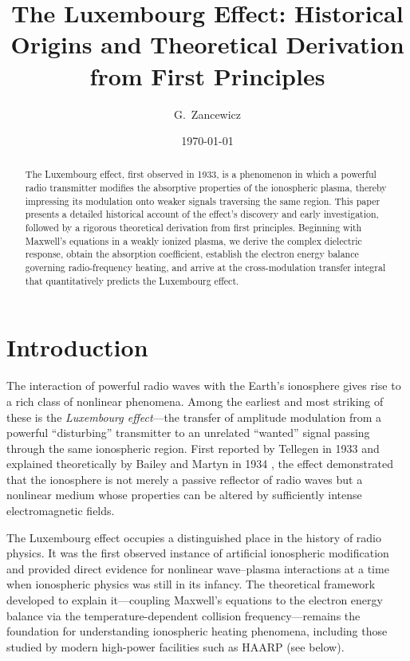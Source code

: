 \documentclass[12pt]{article}
\title{The Luxembourg Effect: Historical Origins and Theoretical Derivation from First Principles}
\author{G.\ Zancewicz}
\date{\today}
\begin{document}
\maketitle

\begin{abstract}
The Luxembourg effect, first observed in 1933, is a phenomenon in which a powerful radio
transmitter modifies the absorptive properties of the ionospheric plasma, thereby impressing
its modulation onto weaker signals traversing the same region.  This paper presents a
detailed historical account of the effect's discovery and early investigation, followed by
a rigorous theoretical derivation from first principles.  Beginning with Maxwell's equations
in a weakly ionized plasma, we derive the complex dielectric response, obtain the
absorption coefficient, establish the electron energy balance governing radio-frequency
heating, and arrive at the cross-modulation transfer integral that quantitatively predicts
the Luxembourg effect.
\end{abstract}

\section{Introduction}

The interaction of powerful radio waves with the Earth's ionosphere gives rise to a rich
class of nonlinear phenomena.  Among the earliest and most striking of these is the
\emph{Luxembourg effect}---the transfer of amplitude modulation from a powerful
``disturbing'' transmitter to an unrelated ``wanted'' signal passing through the same
ionospheric region.  First reported by Tellegen in 1933 \cite{tellegen1933} and explained
theoretically by Bailey and Martyn in 1934 \cite{bailey1934nature,bailey1934philmag}, the
effect demonstrated that the ionosphere is not merely a passive reflector of radio waves
but a nonlinear medium whose properties can be altered by sufficiently intense
electromagnetic fields.

The Luxembourg effect occupies a distinguished place in the history of radio physics.  It
was the first observed instance of artificial ionospheric modification and provided direct
evidence for nonlinear wave--plasma interactions at a time when ionospheric physics was
still in its infancy.  The theoretical framework developed to explain it---coupling
Maxwell's equations to the electron energy balance via the temperature-dependent collision
frequency---remains the foundation for understanding ionospheric heating phenomena,
including those studied by modern high-power facilities such as HAARP (see below).
\end{document}
